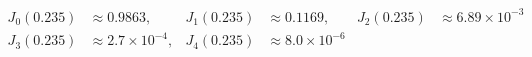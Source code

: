 \documentclass[border=1pt]{standalone}
\begin{document}
\fontsize{14}{16.8}\selectfont
\(\displaystyle \begin{aligned} J_0(0.235) &\approx 0.9863, & J_1(0.235) &\approx 0.1169, & J_2(0.235) &\approx 6.89\!\times\!10^{-3}\\ J_3(0.235) &\approx 2.7\!\times\!10^{-4}, & J_4(0.235) &\approx 8.0\!\times\!10^{-6} \end{aligned}\)
\end{document}
